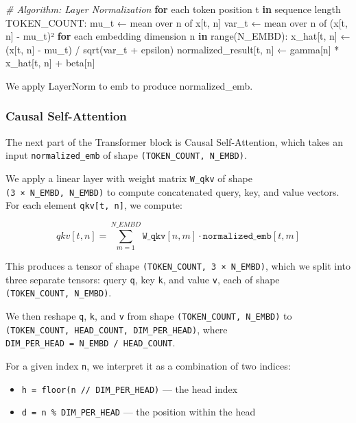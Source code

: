 \documentclass[11pt]{article}
\providecommand{\tightlist}{%
      \setlength{\itemsep}{0pt}\setlength{\parskip}{0pt}}
\newenvironment{Shaded}{}{}
\newcommand{\KeywordTok}[1]{\textcolor[rgb]{0.00,0.44,0.13}{\textbf{{#1}}}}
\newcommand{\CommentTok}[1]{\textcolor[rgb]{0.38,0.63,0.69}{\textit{{#1}}}}
\newcommand{\NormalTok}[1]{{#1}}
\newcommand{\ControlFlowTok}[1]{\textcolor[rgb]{0.00,0.44,0.13}{\textbf{{#1}}}}
\newcommand{\OperatorTok}[1]{\textcolor[rgb]{0.40,0.40,0.40}{{#1}}}
\newcommand{\BuiltInTok}[1]{{#1}}
\begin{document}
\begin{Shaded}
\begin{Highlighting}[]
\CommentTok{\# Algorithm: Layer Normalization}
\ControlFlowTok{for}\NormalTok{ each token position t }\KeywordTok{in}\NormalTok{ sequence length TOKEN\_COUNT:}
\NormalTok{    mu\_t ← mean over n of x[t, n]}
\NormalTok{    var\_t ← mean over n of (x[t, n] }\OperatorTok{{-}}\NormalTok{ mu\_t)²}
    \ControlFlowTok{for}\NormalTok{ each embedding dimension n }\KeywordTok{in} \BuiltInTok{range}\NormalTok{(N\_EMBD):}
\NormalTok{        x\_hat[t, n] ← (x[t, n] }\OperatorTok{{-}}\NormalTok{ mu\_t) }\OperatorTok{/}\NormalTok{ sqrt(var\_t }\OperatorTok{+}\NormalTok{ epsilon)}
\NormalTok{        normalized\_result[t, n] ← gamma[n] }\OperatorTok{*}\NormalTok{ x\_hat[t, n] }\OperatorTok{+}\NormalTok{ beta[n]}
\end{Highlighting}
\end{Shaded}

We apply LayerNorm to emb to produce normalized\_emb.

    \subsubsection{Causal Self-Attention}\label{causal-self-attention}

The next part of the Transformer block is Causal Self-Attention, which
takes an input \texttt{normalized\_emb} of shape
\texttt{(TOKEN\_COUNT,\ N\_EMBD)}.

We apply a linear layer with weight matrix \texttt{W\_qkv} of shape
\texttt{(3\ ×\ N\_EMBD,\ N\_EMBD)} to compute concatenated query, key,
and value vectors. For each element \texttt{qkv{[}t,\ n{]}}, we compute:

\[
qkv[t, n] = \sum_{m=1}^{N\_EMBD} \texttt{W\_qkv}[n, m] \cdot \texttt{normalized\_emb}[t, m]
\]

This produces a tensor of shape \texttt{(TOKEN\_COUNT,\ 3\ ×\ N\_EMBD)},
which we split into three separate tensors: query \texttt{q}, key
\texttt{k}, and value \texttt{v}, each of shape
\texttt{(TOKEN\_COUNT,\ N\_EMBD)}.

We then reshape \texttt{q}, \texttt{k}, and \texttt{v} from shape
\texttt{(TOKEN\_COUNT,\ N\_EMBD)} to
\texttt{(TOKEN\_COUNT,\ HEAD\_COUNT,\ DIM\_PER\_HEAD)}, where
\texttt{DIM\_PER\_HEAD\ =\ N\_EMBD\ /\ HEAD\_COUNT}.

For a given index \texttt{n}, we interpret it as a combination of two
indices:

\begin{itemize}
\tightlist
\item
  \texttt{h\ =\ floor(n\ //\ DIM\_PER\_HEAD)} --- the head index
\item
  \texttt{d\ =\ n\ \%\ DIM\_PER\_HEAD} --- the position within the head
\end{itemize}
\end{document}

